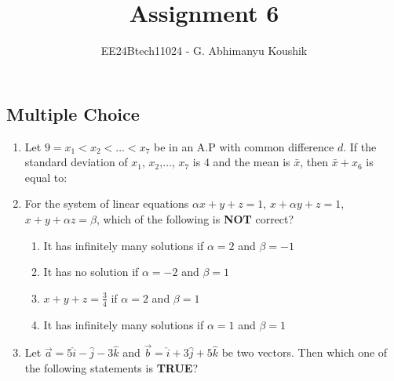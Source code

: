 \documentclass[journal,12pt,onecolumn]{IEEEtran}
\theoremstyle{remark}
\begin{document}
\title{Assignment 6}
\author{EE24Btech11024 - G. Abhimanyu Koushik}
\maketitle
\renewcommand{\thefigure}{\theenumi}
\renewcommand{\thetable}{\theenumi}
\subsection{Multiple Choice}
\begin{enumerate}

\item Let $9=x_1<x_2<\dots <x_7$ be in an A.P with common difference $d$. If the standard deviation of $x_1$, $x_2$,$\dots$, $x_7$ is $4$ and the mean is $\bar{x}$, then $\bar{x}+x_6$ is equal to:

\hfill{}
\begin{enumerate}
\end{enumerate}

\item For the system of linear equations $\alpha x+y+z=1$, $x+\alpha y+z=1$, $x+y+\alpha z=\beta$, which of the following is \textbf{NOT} correct?

\hfill{}
\begin{enumerate}
\item It has infinitely many solutions if $\alpha=2$ and $\beta=-1$
\item It has no solution if $\alpha=-2$ and $\beta=1$
\item $x+y+z=\frac{3}{4}$ if $\alpha=2$ and $\beta=1$
\item It has infinitely many solutions if $\alpha=1$ and $\beta=1$
\end{enumerate}

\item Let $\vec{a}=5\hat{i}-\hat{j}-3\hat{k}$ and $\vec{b}=\hat{i}+3\hat{j}+5\hat{k}$ be two vectors. Then which one of the following statements is \textbf{TRUE}?


\end{enumerate}
\end{document}
